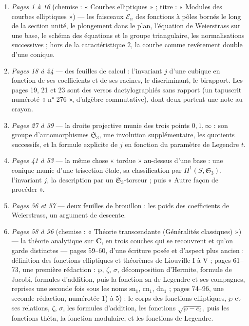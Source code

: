 \documentclass[11pt,a4paper]{article}
\begin{document}
\begin{enumerate}
\item \emph{Pages 1 à 16} (chemise : « Courbes elliptiques » ; titre :
« Modules des courbes elliptiques ») --- les faisceaux $\mathcal{E}_n$ des
fonctions à pôles bornés le long de la section unité, le plongement dans le
plan, l'équation de Weierstrass sur une base, le schéma des équations et le
groupe triangulaire, les normalisations successives ; hors de la
caractéristique $2$, la courbe comme revêtement double d'une conique.
\item \emph{Pages 18 à 24} --- des feuilles de calcul : l'invariant $j$ d'une
cubique en fonction de ses coefficients et de ses racines, le discriminant, le
birapport. Les pages 19, 21 et 23 sont des versos dactylographiés sans rapport
(un tapuscrit numéroté « n° 276 », d'algèbre commutative), dont deux portent
une note au crayon.
\item \emph{Pages 27 à 39} --- la droite projective munie des trois points
$0, 1, \infty$ : son groupe d'automorphismes $\mathfrak{S}_3$, une involution
supplémentaire, les quotients successifs, et la formule explicite de $j$ en
fonction du paramètre de Legendre $t$.
\item \emph{Pages 41 à 53} --- la même chose « tordue » au-dessus d'une base :
une conique munie d'une trisection étale, sa classification par
$H^1(S, \mathfrak{S}_3)$, l'invariant $j$, la description par un
$\mathfrak{S}_3$-torseur ; puis « Autre façon de procéder ».
\item \emph{Pages 56 et 57} --- deux feuilles de brouillon : les poids des
coefficients de Weierstrass, un argument de descente.
\item \emph{Pages 58 à 96} (chemise : « Théorie transcendante (Généralités
classiques) ») --- la théorie analytique sur $\mathbf{C}$, en trois couches qui
se recouvrent et qu'on garde distinctes --- pages 59--60, d'une écriture posée
et d'aspect plus ancien : définition des fonctions elliptiques et théorèmes de
Liouville I à V ; pages 61--73, une première rédaction : $\wp$, $\zeta$,
$\sigma$, décomposition d'Hermite, formule de Jacobi, formules d'addition, puis
la fonction $\mathrm{sn}$ de Legendre et ses compagnes, reprises une seconde
fois sous les noms $\mathrm{sn}_1$, $\mathrm{cn}_1$, $\mathrm{dn}_1$ ; pages
74--96, une seconde rédaction, numérotée 1) à 5) : le corps des fonctions
elliptiques, $\wp$ et ses relations, $\zeta$, $\sigma$, les formules
d'addition, les fonctions $\sqrt{\wp - e_i}$, puis les fonctions thêta, la
fonction modulaire, et les fonctions de Legendre.
\end{enumerate}
\end{document}
